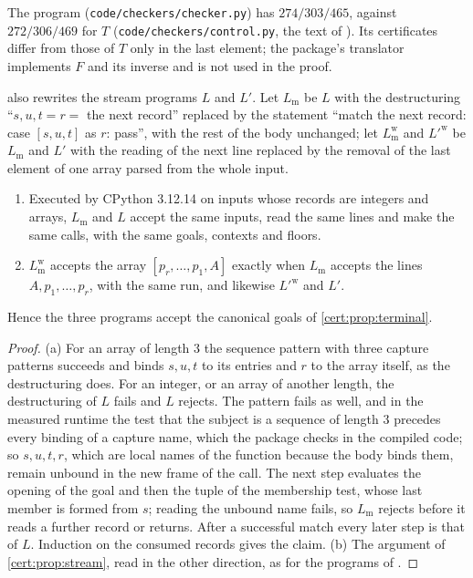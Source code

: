 The program (\texttt{code/checkers/checker.py}) has $274/303/465$, against
$272/306/469$ for $T$ (\texttt{code/checkers/control.py}, the text of
). Its certificates differ from those of $T$ only in the last
element; the package's translator implements $F$ and its inverse and is not used
in the proof.

 also rewrites the stream programs $L$ and $L'$. Let
$L_{\mathrm m}$ be $L$ with the destructuring ``$s,u,t=r=$ the next record''
replaced by the statement ``match the next record: case $[s,u,t]$ as $r$: pass'',
with the rest of the body unchanged; let $L^{\mathrm w}_{\mathrm m}$ and
$L'^{\mathrm w}$ be $L_{\mathrm m}$ and $L'$ with the reading of the next line
replaced by the removal of the last element of one array parsed from the whole
input.

\begin{proposition}\label{cert:prop:match}
\begin{enumerate}[label=(\alph*)]
\item Executed by CPython 3.12.14 on inputs whose records are integers and
arrays, $L_{\mathrm m}$ and $L$ accept the same inputs, read the same lines and
make the same calls, with the same goals, contexts and floors.
\item $L^{\mathrm w}_{\mathrm m}$ accepts the array $[p_r,\dots,p_1,A]$ exactly
when $L_{\mathrm m}$ accepts the lines $A,p_1,\dots,p_r$, with the same run, and
likewise $L'^{\mathrm w}$ and $L'$.
\end{enumerate}
Hence the three programs accept the canonical goals of \cref{cert:prop:terminal}.
\end{proposition}
\begin{proof}
(a) For an array of length $3$ the sequence pattern with three capture patterns
succeeds and binds $s,u,t$ to its entries and $r$ to the array itself, as the
destructuring does. For an integer, or an array of another length, the
destructuring of $L$ fails and $L$ rejects. The pattern fails as well, and in
the measured runtime the test that the subject is a sequence of length $3$
precedes every binding of a capture name, which the package checks in the
compiled code; so $s,u,t,r$, which are local names of the function because the
body binds them, remain unbound in the new frame of the call. The next step
evaluates the opening of the goal and then the tuple of the membership test,
whose last member is formed from $s$; reading the unbound name fails, so
$L_{\mathrm m}$ rejects before it reads a further record or returns. After a
successful match every later step is that of $L$. Induction on the consumed
records gives the claim. (b) The argument of \cref{cert:prop:stream}, read in
the other direction, as for the programs of .
\end{proof}

